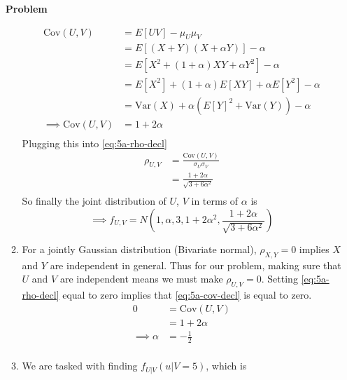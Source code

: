 \documentclass[12pt]{article}
\newenvironment{Ex}{\textbf{Problem}\vspace{.75em}\\}{}
\begin{document}
\begin{enumerate}
\begin{Ex}
\begin{solution}
\begin{enumerate}
\begin{equation}
\begin{aligned}
            \text{Cov}(U,V) &= E[UV] - \mu_U \mu_V \\
            &= E[(X+Y)(X+\alpha Y)] - \alpha \\
            &= E[X^2 + (1+\alpha)XY + \alpha Y^2] - \alpha \\
            &= E[X^2] + (1+\alpha)E[XY] + \alpha E[Y^2] - \alpha \\
            &= \text{Var}(X) + \alpha(E[Y]^2 + \text{Var}(Y)) -
            \alpha \\
            \implies \text{Cov}(U,V) &= 1 + 2\alpha \\
          \end{aligned}
        \end{equation}
        Plugging this into \cref{eq:5a-rho-decl}
        \begin{equation}
          \label{eq:5a-rho}
          \begin{aligned}
            \rho_{U,V} &= \frac{\text{Cov}(U,V)}{\sigma_U \sigma_V}
            \\
            &= \frac{1 + 2\alpha}{\sqrt{3+6\alpha^2}} \\
          \end{aligned}
        \end{equation}
        So finally the joint distribution of $U$, $V$ in terms of
        $\alpha$ is
        \begin{equation}
          \label{eq:5a-sol}
          \implies f_{U,V} = N(1, \alpha, 3, 1+2\alpha^2, \frac{1 +
            2\alpha}{\sqrt{3+6\alpha^2}})
        \end{equation}
      \item For a jointly Gaussian distribution (Bivariate normal),
        $\rho_{X,Y} = 0$ implies $X$ and $Y$ are independent in
        general. Thus for our problem, making sure that $U$ and $V$
        are independent means we must make $\rho_{U,V} = 0$. Setting
        \cref{eq:5a-rho-decl} equal to zero implies that
        \cref{eq:5a-cov-decl} is equal to zero.
        \begin{equation}
          \label{eq:5b-cov}
          \begin{aligned}
            0 &= \text{Cov}(U,V) \\
            &= 1 + 2 \alpha \\
            \implies \alpha &= -\frac{1}{2} \\
          \end{aligned}
        \end{equation}
      \item We are tasked with finding $f_{U|V}(u|V=5)$, which is

\end{enumerate}
\end{solution}
\end{Ex}
\end{enumerate}
\end{document}
